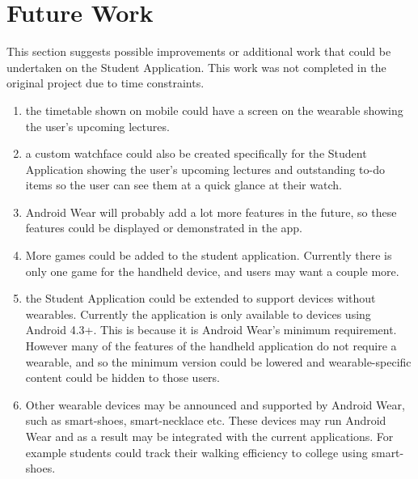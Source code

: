 \section{Future Work}

This section suggests possible improvements or additional work that could be
undertaken on the Student Application. This work was not completed in the
original project due to time constraints.

\begin{enumerate}
\item the timetable shown on mobile could have a screen on the wearable showing
    the user's upcoming lectures.
\item a custom watchface could also be created specifically for the Student
    Application showing the user's upcoming lectures and outstanding to-do items
    so the user can see them at a quick glance at their watch.
\item Android Wear will probably add a lot more features in the future, so these
    features could be displayed or demonstrated in the app.
\item More games could be added to the student application. Currently there is
    only one game for the handheld device, and users may want a couple more.
\item the Student Application could be extended to support devices without
    wearables. Currently the application is only available to devices using 
    Android 4.3+. This is because it is Android Wear's minimum requirement.
    However many of the features of the handheld application do not require
    a wearable, and so the minimum version could be lowered and
    wearable-specific content could be hidden to those users.
\item Other wearable devices may be announced and supported by Android Wear,
    such as smart-shoes, smart-necklace etc. These devices may run Android Wear
    and as a result may be integrated with the current applications. For example
    students could track their walking efficiency to college using smart-shoes.
\end{enumerate}

